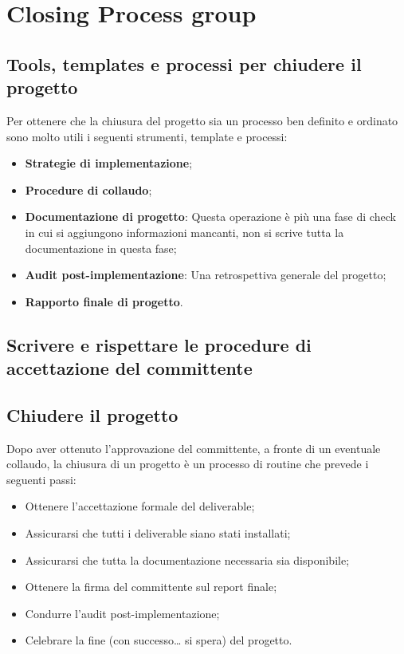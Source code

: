 \section{Closing Process group}
\subsection{Tools, templates e processi per chiudere il progetto}
Per ottenere che la chiusura del progetto sia un processo ben definito e ordinato sono molto utili i seguenti strumenti, template e processi:
\begin{itemize}
	\item \textbf{Strategie di implementazione};
	\item \textbf{Procedure di collaudo};
	\item \textbf{Documentazione di progetto}: Questa operazione è più una fase di check in cui si aggiungono informazioni mancanti, non si scrive tutta la documentazione in questa fase;
	\item \textbf{Audit post-implementazione}: Una retrospettiva generale del progetto;
	\item \textbf{Rapporto finale di progetto}.
\end{itemize}

\subsection{Scrivere e rispettare le procedure di accettazione del committente}
\subsection{Chiudere il progetto}
Dopo aver ottenuto l’approvazione del committente, a fronte di un eventuale collaudo, la chiusura di un progetto è un processo di routine che prevede i seguenti passi:
\begin{itemize}
	\item Ottenere l’accettazione formale del deliverable;
	\item Assicurarsi che tutti i deliverable siano stati installati;
	\item Assicurarsi che tutta la documentazione necessaria sia disponibile;
	\item Ottenere la firma del committente sul report finale;
	\item Condurre l’audit post-implementazione;
	\item Celebrare la fine (con successo… si spera) del progetto.
\end{itemize}

